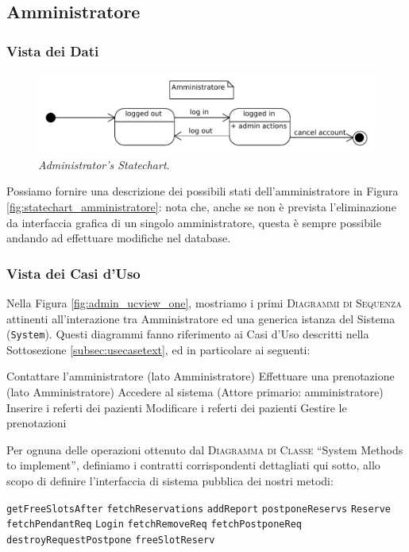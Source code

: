 \subsection{Amministratore}
\subsubsection{Vista dei Dati}
\begin{figure}[!t]
\includegraphics[scale=0.7]{svgs/statechart_amministratore}
\caption{\textit{Administrator's Statechart}.}
\label{fig:statechart_amministratore}
\end{figure}
Possiamo fornire una descrizione dei possibili stati dell'amministratore in
Figura \vref{fig:statechart_amministratore}: nota che, anche se non è prevista
l'eliminazione da interfaccia grafica di un singolo amministratore, questa è
sempre possibile andando ad effettuare modifiche nel database.


\subsubsection{Vista dei Casi d'Uso}
Nella Figura \vref{fig:admin_ucview_one}, mostriamo i primi \textsc{Diagrammi di 
Sequenza} attinenti all'interazione tra Amministratore ed una generica istanza
del Sistema (\texttt{System}). Questi diagrammi fanno riferimento
ai Casi d'Uso descritti nella Sottosezione \vref{subsec:usecasetext}, ed in
particolare ai seguenti:
\begin{itemize}
\diam Contattare l'amministratore (lato Amministratore)
\diam Effettuare una prenotazione (lato Amministratore)
\diam Accedere al sistema (Attore primario: amministratore)
\diam Inserire i referti dei pazienti
\diam Modificare i referti dei pazienti
\diam Gestire le prenotazioni
\end{itemize}

Per ognuna delle operazioni ottenuto dal \textsc{Diagramma di Classe} ``System 
Methods to implement'', definiamo i contratti corrispondenti dettagliati qui
sotto, allo scopo di definire l'interfaccia 
di sistema pubblica dei nostri metodi:
\begin{itemize}
\diam \texttt{getFreeSlotsAfter}
\diam \texttt{fetchReservations}
\diam \texttt{addReport}
\diam \texttt{postponeReservs}
\diam \texttt{Reserve}
\diam \texttt{fetchPendantReq}
\diam \texttt{Login}
\diam \texttt{fetchRemoveReq}
\diam \texttt{fetchPostponeReq}
\diam \texttt{destroyRequestPostpone}
\diam \texttt{freeSlotReserv}
\end{itemize}

